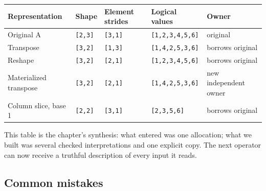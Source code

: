\documentclass[
  10pt,
]{article}
\newcounter{none} %
\begin{document}
{\def\LTcaptype{none} %
\begin{longtable}[]{@{}
  >{\raggedright\arraybackslash}p{}
  >{\raggedright\arraybackslash}p{}
  >{\raggedright\arraybackslash}p{}
  >{\raggedright\arraybackslash}p{}
  >{\raggedright\arraybackslash}p{}@{}}
\toprule\noalign{}
\begin{minipage}[b]{\linewidth}\raggedright
Representation
\end{minipage} & \begin{minipage}[b]{\linewidth}\raggedright
Shape
\end{minipage} & \begin{minipage}[b]{\linewidth}\raggedright
Element strides
\end{minipage} & \begin{minipage}[b]{\linewidth}\raggedright
Logical values
\end{minipage} & \begin{minipage}[b]{\linewidth}\raggedright
Owner
\end{minipage} \\
\midrule\noalign{}
\endhead
\bottomrule\noalign{}
\endlastfoot
Original A & \texttt{{[}2,3{]}} & \texttt{{[}3,1{]}} &
\texttt{{[}1,2,3,4,5,6{]}} & original \\
Transpose & \texttt{{[}3,2{]}} & \texttt{{[}1,3{]}} &
\texttt{{[}1,4,2,5,3,6{]}} & borrows original \\
Reshape & \texttt{{[}3,2{]}} & \texttt{{[}2,1{]}} &
\texttt{{[}1,2,3,4,5,6{]}} & borrows original \\
Materialized transpose & \texttt{{[}3,2{]}} & \texttt{{[}2,1{]}} &
\texttt{{[}1,4,2,5,3,6{]}} & new independent owner \\
Column slice, base 1 & \texttt{{[}2,2{]}} & \texttt{{[}3,1{]}} &
\texttt{{[}2,3,5,6{]}} & borrows original \\
\end{longtable}
}

This table is the chapter's synthesis: what entered was one allocation;
what we built was several checked interpretations and one explicit copy.
The next operator can now receive a truthful description of every input
it reads.

\subsection{Common mistakes}\label{common-mistakes-4}
\end{document}
